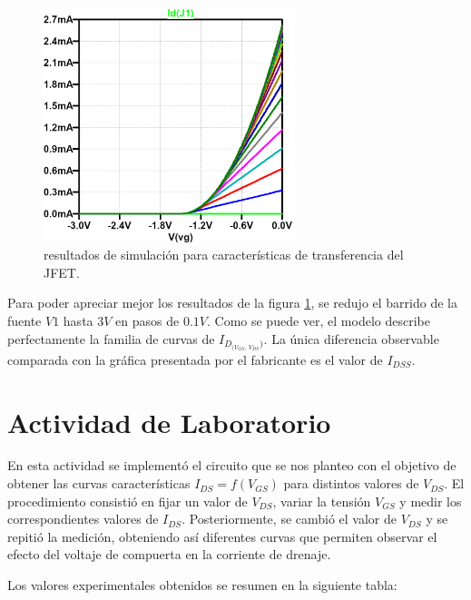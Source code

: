     \begin{figure}[!ht]
      \centering
      \includegraphics[width=0.65\textwidth]{images/transferencia-id_vds-vgs.png}
      \caption{resultados de simulación para características de transferencia del JFET.}
      \label{fig:sim.transf}
    \end{figure}

    Para poder apreciar mejor los resultados de la figura \ref{fig:sim.transf}, se redujo el barrido de la fuente $V1$
    hasta $3V$ en pasos de $0.1V$. Como se puede ver, el modelo describe perfectamente la familia de curvas de
    $I_{D_{(V_{GS}, \, V_{DS}})}$. La única diferencia observable comparada con la gráfica presentada por el fabricante es el
    valor de $I_{DSS}$.

\section{Actividad de Laboratorio}

    En esta actividad se implementó el circuito que se nos planteo con el objetivo de obtener las curvas características
    $I_{DS} = f(V_{GS})$ para distintos valores de $V_{DS}$.  El procedimiento consistió en fijar un valor de $V_{DS}$,
    variar la tensión $V_{GS}$ y medir los correspondientes valores de $I_{DS}$. Posteriormente, se cambió el valor de
    $V_{DS}$ y se repitió la medición, obteniendo así diferentes curvas que permiten observar el efecto del voltaje de
    compuerta en la corriente de drenaje.  
    
    Los valores experimentales obtenidos se resumen en la siguiente tabla:
    
